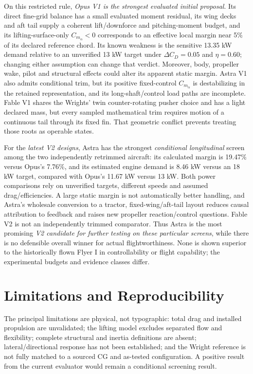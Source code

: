 \documentclass[10pt,letterpaper]{article}
\begin{document}
On this restricted rule, \emph{Opus V1 is the strongest evaluated initial proposal}. Its direct fine-grid balance has a small evaluated moment residual, its wing decks and aft tail supply a coherent lift/downforce and pitching-moment budget, and its lifting-surface-only $C_{m_\alpha}<0$ corresponds to an effective local margin near 5\% of its declared reference chord. Its known weakness is the sensitive 13.35 kW demand relative to an unverified 13 kW target under $\Delta C_D=0.05$ and $\eta=0.60$; changing either assumption can change that verdict. Moreover, body, propeller wake, pilot and structural effects could alter its apparent static margin. Astra V1 also admits conditional trim, but its positive fixed-control $C_{m_\alpha}$ is destabilizing in the retained representation, and its long-shaft/control load paths are incomplete. Fable V1 shares the Wrights' twin counter-rotating pusher choice and has a light declared mass, but every sampled mathematical trim requires motion of a continuous tail through its fixed fin. That geometric conflict prevents treating those roots as operable states.

For the \emph{latest V2 designs}, Astra has the strongest \emph{conditional longitudinal} screen among the two independently retrimmed aircraft: its calculated margin is 19.47\% versus Opus's 7.76\%, and its estimated engine demand is 8.46 kW versus an 18 kW target, compared with Opus's 11.67 kW versus 13 kW. Both power comparisons rely on unverified targets, different speeds and assumed drag/efficiencies. A large static margin is not automatically better handling, and Astra's wholesale conversion to a tractor, fixed-wing/aft-tail layout reduces causal attribution to feedback and raises new propeller reaction/control questions. Fable V2 is not an independently trimmed comparator. Thus Astra is the most promising \emph{V2 candidate for further testing on these particular screens}, while there is no defensible overall winner for actual flightworthiness. None is shown superior to the historically flown Flyer I in controllability or flight capability; the experimental budgets and evidence classes differ.

\section{Limitations and Reproducibility}
The principal limitations are physical, not typographic: total drag and installed propulsion are unvalidated; the lifting model excludes separated flow and flexibility; complete structural and inertia definitions are absent; lateral/directional response has not been established; and the Wright reference is not fully matched to a sourced CG and as-tested configuration. A positive result from the current evaluator would remain a conditional screening result.
\end{document}

